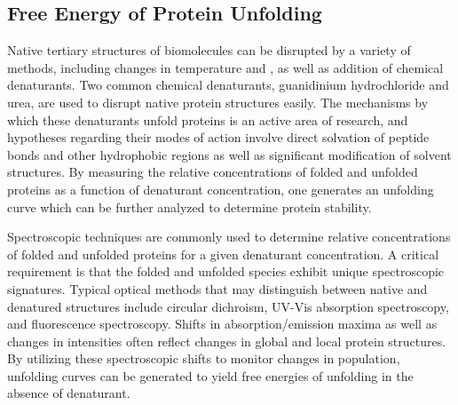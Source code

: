 
\subsection{Free Energy of Protein Unfolding} %
\label{sub:free_energy_of_protein_unfolding}

Native tertiary structures of biomolecules can be disrupted by a variety of methods, including changes in temperature and \pH, as well as addition of chemical denaturants. 
Two common chemical denaturants, guanidinium hydrochloride and urea, are used to disrupt native protein structures easily. 
The mechanisms by which these denaturants unfold proteins is an active area of research, and hypotheses regarding their modes of action involve direct solvation of peptide bonds and other hydrophobic regions as well as significant modification of solvent structures. 
By measuring the relative concentrations of folded and unfolded proteins as a function of denaturant concentration, one generates an unfolding curve which can be further analyzed to determine protein stability. 

Spectroscopic techniques are commonly used to determine relative concentrations of folded and unfolded proteins for a given denaturant concentration. 
A critical requirement is that the folded and unfolded species exhibit unique spectroscopic signatures. 
Typical optical methods that may distinguish between native and denatured structures include circular dichroism, UV-Vis absorption spectroscopy, and fluorescence spectroscopy. 
Shifts in absorption/emission maxima as well as changes in intensities often reflect changes in global and local protein structures. 
By utilizing these spectroscopic shifts to monitor changes in population, unfolding curves can be generated to yield free energies of unfolding in the absence of denaturant. 

